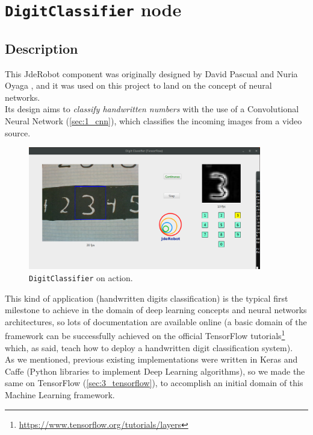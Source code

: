 \chapter{\texttt{DigitClassifier} node}
	\label{chap:4_digitclassifier}
	\section{Description}
		This JdeRobot component was originally designed by David Pascual \cite{dpascualhe} and Nuria Oyaga \cite{noyaga}, and it was used on this project to land on the concept of neural networks.\\
	
		Its design aims to \textit{classify handwritten numbers} with the use of a Convolutional Neural Network (\autoref{sec:1_cnn}), which classifies the incoming images from a video source.\\
		
		\begin{figure}[h]
			\centering
			\includegraphics[width=4in]{images/digitclassifier}
			\caption{\texttt{DigitClassifier} on action.}
			\label{fig:4_digitclassifier}
		\end{figure}
		
		This kind of application (handwritten digits classification) is the typical first milestone to achieve in the domain of deep learning concepts and neural networks architectures, so lots of documentation are available online (a basic domain of the framework can be successfully achieved on the official TensorFlow tutorials\footnote{\url{https://www.tensorflow.org/tutorials/layers}} which, as said, teach how to deploy a handwritten digit classification system).\\


		As we mentioned, previous existing implementations were written in Keras \cite{dpascualhe} and Caffe \cite{noyaga} (Python libraries to implement Deep Learning algorithms), so we made the same on TensorFlow (\autoref{sec:3_tensorflow}), to accomplish an initial domain of this Machine Learning framework.\\
		
